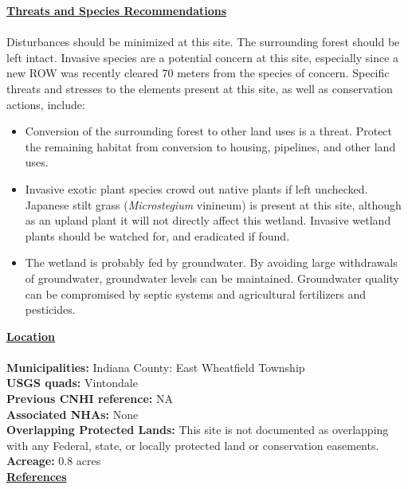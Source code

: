 \documentclass{article}\usepackage[]{graphicx}\usepackage[]{color}
\begin{document}
\medskip
\noindent
\textbf{\underline{Threats and Species Recommendations}}\\\\
\normalsize 
\noindent Disturbances should be minimized at this site. The surrounding forest should be left intact. Invasive species are a potential concern at this site, especially since a new ROW was recently cleared 70 meters from the species of concern. Specific threats and stresses to the elements present at this site, as well as conservation actions, include:  
\begin{itemize}
\item Conversion of the surrounding forest to other land uses is a threat. Protect the remaining habitat from conversion to housing, pipelines, and other land uses.\item Invasive exotic plant species crowd out native plants if left unchecked. Japanese stilt grass (\textit{Microstegium} vinineum) is present at this site, although as an upland plant it will not directly affect this wetland. Invasive wetland plants should be watched for, and eradicated if found.\item The wetland is probably fed by groundwater. By avoiding large withdrawals of groundwater, groundwater levels can be maintained. Groundwater quality can be compromised by septic systems and agricultural fertilizers and pesticides.
\end{itemize}

\bigskip

\pagebreak[1]
\noindent\textbf{\underline{Location}}\\\\
\smallskip
\textbf{Municipalities:} Indiana County: East Wheatfield Township \\
\textbf{USGS quads:} Vintondale \\
\textbf{Previous CNHI reference:} NA \\
\textbf{Associated NHAs:} None \\ 
\textbf{Overlapping Protected Lands:} This site is not documented as overlapping with any Federal, state, or locally protected land or conservation easements. \\
\textbf{Acreage:} 0.8 acres \\  
  
\noindent\textbf{\underline{References}}
%
\printbibliography[heading=none]
\end{document}
